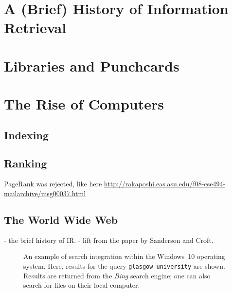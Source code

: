 \section{A (Brief) History of Information Retrieval}\label{sec:ir_background:history}


\section{Libraries and Punchcards}

\section{The Rise of Computers}

\subsection{Indexing}

\subsection{Ranking}

PageRank was rejected, like here \url{http://rakaposhi.eas.asu.edu/f08-cse494-mailarchive/msg00037.html}

\subsection{The World Wide Web}

- the brief history of IR.
- lift from the paper by Sanderson and Croft.

\begin{figure}[t!]
    \centering
    \caption[Search Integration within Windows\textregistered~10]{An example of search integration within the Windows\textregistered~10 operating system. Here, results for the query \texttt{glasgow university} are shown. Results are returned from the \emph{Bing} search engine; one can also search for files on their local computer.}
    \label{fig:search_integration}
\end{figure}

